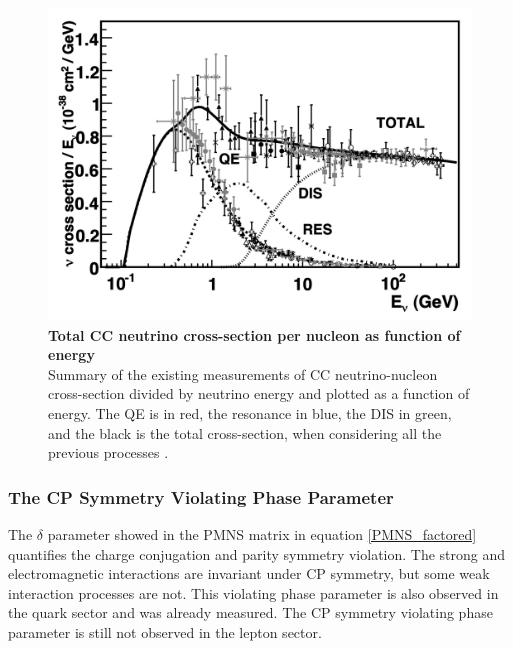 \begin{figure}[h!]
	\begin{center}
		\includegraphics[scale=0.35]{Figures/nu_scatter.jpeg}
		\caption[Total CC neutrino cross-section per nucleon as function of energy]{ {\textbf{Total CC neutrino cross-section per nucleon as function of energy}} \\ Summary of the existing measurements of CC neutrino-nucleon cross-section divided by neutrino energy and plotted as a function of energy. The QE is in red, the resonance in blue, the DIS in green, and the black is the total cross-section, when considering all the previous processes \cite{nu_scatter_zeller}.}
		\label{nu_scatter}	
	\end{center}
\end{figure}
%
\subsubsection{The CP Symmetry Violating Phase Parameter}
%
The $\delta$ parameter showed in the PMNS matrix in equation \ref{PMNS_factored} quantifies the charge conjugation and parity symmetry violation. The strong and electromagnetic interactions are invariant under CP symmetry, but some weak interaction processes are not. This violating phase parameter is also observed in the quark sector and was already measured. The CP symmetry violating phase parameter is still not observed in the lepton sector.
%
